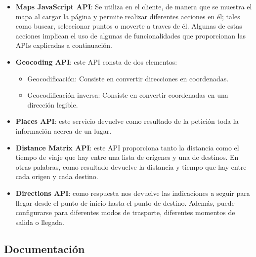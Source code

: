 \begin{itemize}
	\item \textbf{Maps JavaScript API}: Se utiliza en el cliente, de manera que se muestra el mapa al cargar la página y permite realizar diferentes acciones en él; tales como buscar, seleccionar puntos o moverte a traves de él. Algunas de estas acciones implican el uso de algunas de funcionalidades que proporcionan las APIs explicadas a continuación.
	\item \textbf{Geocoding API}: este API consta de dos elementos:
	\begin{itemize}
		\item Geocodificación: Consiste en convertir direcciones en coordenadas.
		\item Geocodificación inversa: Consiste en convertir coordenadas en una dirección legible.
	\end{itemize}
	\item \textbf{Places API}: este servicio devuelve como resultado de la petición toda la información acerca de un lugar.
	\item \textbf{Distance Matrix API}: este API proporciona tanto la distancia como el tiempo de viaje que hay entre una lista de orígenes y una de destinos. En otras palabras, como resultado devuelve la distancia y tiempo que hay entre cada origen y cada destino.
	\item \textbf{Directions API}: como respuesta nos devuelve las indicaciones a seguir para llegar desde el punto de inicio hasta el punto de destino. Además, puede configurarse para diferentes modos de trasporte, diferentes momentos de salida o llegada.
\end{itemize}




\subsection{Documentación}



